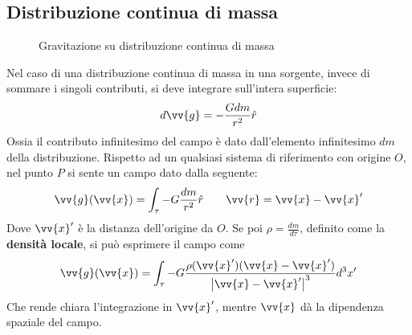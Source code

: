 \documentclass[a4paper, oneside]{book}
\begin{document}
\subsection{Distribuzione continua di massa}
\begin{figure}
    \centering
    \caption{Gravitazione su distribuzione continua di massa}
\end{figure}
Nel caso di una distribuzione continua di massa in una sorgente, invece di sommare i singoli 
contributi, si deve integrare sull'intera superficie:
\begin{gather*}
    d\vv{g} = -\frac{Gdm}{r^{2}}\hat{r}  
\end{gather*}
Ossia il contributo infinitesimo del campo è dato dall'elemento infinitesimo
$dm$ della distribuzione. Rispetto ad un qualsiasi sistema di riferimento con origine $O$, 
nel punto $P$ si sente un campo dato dalla seguente:
\begin{gather*}
    \vv{g}(\vv{x} ) = \int_{\tau} - G\frac{dm}{r^{2}}\hat{r} \qquad \vv{r} = \vv{x} - \vv{x}'      
\end{gather*}
Dove $\vv{x}'$ è la distanza dell'origine da $O$. Se poi $\rho = \frac{dm}{d\tau}$, definito come la \textbf{densità locale}, si 
può esprimere il campo come
\begin{gather*}
    \vv{g}(\vv{x} ) = \int_{\tau} - G\frac{\rho(\vv{x}' ) (\vv{x} - \vv{x}'  )}{\left| \vv{x} - \vv{x}'   \right|^{3} }  d^{3}x'
\end{gather*}
Che rende chiara l'integrazione in $\vv{x}'$, mentre $\vv{x}$ dà la dipendenza spaziale del campo.
\end{document}
